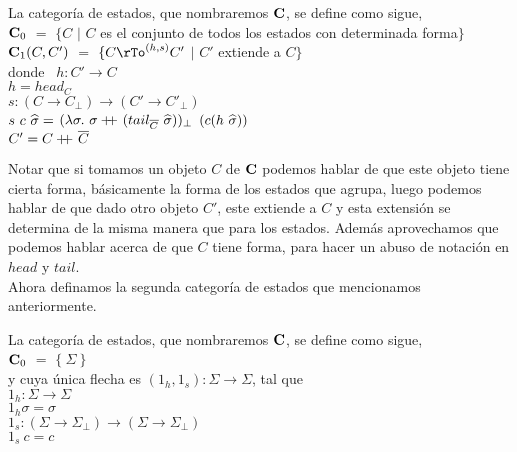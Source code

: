 \begin{definition}\label{algol:disciplinestatecategory}
La categor\'ia de estados, que nombraremos $\textbf{C}$, se define como sigue,\\

\indent
$\textbf{C}_0$ $=$ $\{C$ $|$ $C$ es el conjunto de todos los estados con determinada forma$\}$\\
\indent
$\textbf{C}_1(C,C')$ $=$ $\{C \rTo^{(h,s)} C'$ $|$ $C'$ extiende a $C\}$\\

donde \ $h: C' \rightarrow C$\\
\indent \indent \indent
	  $h = head_C$\\
\indent \indent \indent
	  $s: (C \rightarrow C_{\bot}) \rightarrow (C' \rightarrow C'_{\bot})$\\
\indent \indent \indent
	  $s \ c \ \widehat{\sigma} =$ 
	  	   $(\lambda \sigma. \ \sigma +\kern-1.3ex+\kern0.8ex (tail_{\overline{C}} \ \widehat{\sigma}))_{\bot}$
	  	   	$(c(h \ \widehat{\sigma}))$\\
\indent \indent \indent
	 $C' = C +\kern-1.3ex+\kern0.8ex \overline{C}$

\end{definition}

Notar que si tomamos un objeto $C$ de $\textbf{C}$ podemos hablar de que este objeto
tiene cierta forma, b\'asicamente la forma de los estados que agrupa, luego
podemos hablar de que dado otro objeto $C'$, este extiende a $C$ y esta extensi\'on
se determina de la misma manera que para los estados. Adem\'as aprovechamos 
que podemos hablar acerca de que $C$ tiene forma, para hacer un abuso de 
notaci\'on en $head$ y $tail$.\\

Ahora definamos la segunda categor\'ia de estados que mencionamos anteriormente.

\begin{definition}\label{algol:statecategory}
La categor\'ia de estados, que nombraremos $\textbf{C}$, se define como sigue,\\

\indent
$\textbf{C}_0$ $=$ $\{\ \Sigma \ \}$\\

y cuya \'unica flecha es $(1_h,1_s) : \Sigma \rightarrow \Sigma$, tal que\\

$1_h : \Sigma \rightarrow \Sigma$\\
\indent
$1_h \sigma = \sigma$\\
\indent
$1_s: (\Sigma \rightarrow \Sigma_{\bot}) \rightarrow (\Sigma \rightarrow \Sigma_{\bot})$\\
\indent
$1_s \ c = c$

\end{definition}

